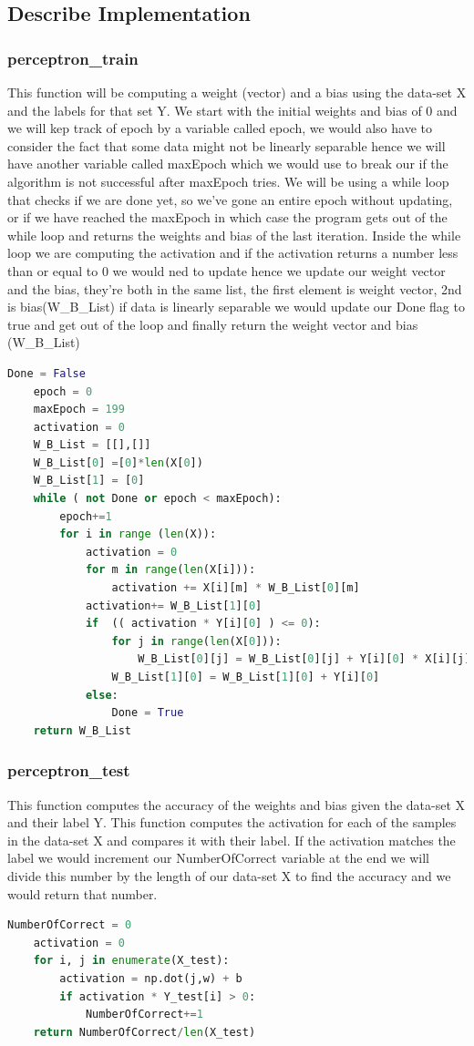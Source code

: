 \documentclass{article}
\begin{document}
	\subsection{Describe Implementation}
	\subsubsection{perceptron\_train}
	This function will be computing a weight (vector) and a bias using the data-set X and the labels for that set Y. We start with the initial weights and bias of 0 and we will kep track of epoch by a variable called epoch, we would also have to consider the fact that some data might not be linearly separable hence we will have another variable called maxEpoch which we would use to break our if the algorithm is not successful after maxEpoch tries. We will be using a while loop that checks if we are done yet, so we've gone an entire epoch without updating, or if we have reached the maxEpoch in which case the program gets out of the while loop and returns the weights and bias of the last iteration. Inside the while loop we are computing the activation and if the activation returns a number less than or equal to 0 we would ned to update hence we update our weight vector and the bias, they're both in the same list, the first element is weight vector, 2nd is bias(W\_B\_List) if data is linearly separable we would update our Done flag to true and get out of the loop and finally return the weight vector and bias (W\_B\_List)
	\begin{lstlisting}[language=Python]
	Done = False 
	epoch = 0 
	maxEpoch = 199
	activation = 0 
	W_B_List = [[],[]] 
	W_B_List[0] =[0]*len(X[0]) 
	W_B_List[1] = [0]
	while ( not Done or epoch < maxEpoch): 
		epoch+=1
		for i in range (len(X)):
			activation = 0
			for m in range(len(X[i])):
				activation += X[i][m] * W_B_List[0][m]
			activation+= W_B_List[1][0]
			if  (( activation * Y[i][0] ) <= 0):
				for j in range(len(X[0])):
					W_B_List[0][j] = W_B_List[0][j] + Y[i][0] * X[i][j]
				W_B_List[1][0] = W_B_List[1][0] + Y[i][0]
			else:
				Done = True 
	return W_B_List
	\end{lstlisting}
	
	\subsubsection{perceptron\_test}
	This function computes the accuracy of the weights and bias given the data-set X and their label Y. This function computes the activation for each of the samples in the data-set X and compares it with their label. If the activation matches the label we would increment our NumberOfCorrect variable at the end we will divide this number by the length of our data-set X to find the accuracy and we would return that number. 
	\begin{lstlisting}[language=Python]
	NumberOfCorrect = 0
	activation = 0
	for i, j in enumerate(X_test):
		activation = np.dot(j,w) + b 
		if activation * Y_test[i] > 0:
			NumberOfCorrect+=1
	return NumberOfCorrect/len(X_test)
	\end{lstlisting}
	 
\end{document}
